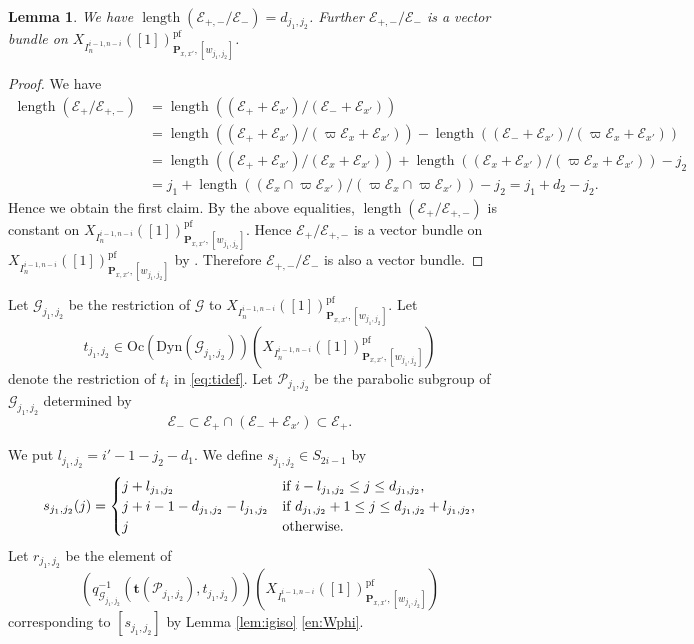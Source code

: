 \documentclass[12pt,a4paper]{article}
\newtheorem{lem}[thm]{Lemma}
\DeclareMathOperator{\length}{length}
\newcommand{\bfP}{\mathbf{P}}
\newcommand{\bft}{\mathbf{t}}
\newcommand{\cE}{\mathcal{E}}
\newcommand{\sG}{\mathscr{G}}
\newcommand{\sP}{\mathscr{P}}
\newcommand{\pf}{\mathrm{pf}}
\begin{document}
\begin{lem}\label{lem:lengE+-}
We have 
$\length (\cE_{+,-}/\cE_-)=d_{j_1,j_2}$. 
Further $\cE_{+,-}/\cE_-$ is a vector bundle on 
$X_{I_{n}^{i-1,n-i}}([1])_{\bfP_{x,x'},[w_{j_1,j_2}]}^{\pf}$. 
\end{lem}
\begin{proof}
We have 
\begin{align*}
 \length (\cE_+/\cE_{+,-})&= \length ((\cE_+ +\cE_{x'})/(\cE_- +\cE_{x'})) \\ 
 &=\length ((\cE_+ +\cE_{x'})/(\varpi \cE_x + \cE_{x'} )) - \length ((\cE_- +\cE_{x'})/(\varpi \cE_x + \cE_{x'} )) \\ 
  &=\length ((\cE_+ +\cE_{x'})/( \cE_x + \cE_{x'} )) + 
  \length ((\cE_x + \cE_{x'})/(\varpi \cE_x + \cE_{x'} )) 
  - j_2 \\ 
  &=j_1 + 
  \length (( \cE_x \cap \varpi \cE_{x'} )/(\varpi \cE_x \cap \varpi\cE_{x'})) 
  - j_2 =j_1+d_2 -j_2. 
\end{align*}
Hence we obtain the first claim. 
By the above equalities, 
$\length (\cE_+/\cE_{+,-})$ is constant on 
$X_{I_{n}^{i-1,n-i}}([1])_{\bfP_{x,x'},[w_{j_1,j_2}]}^{\pf}$. Hence $\cE_+/\cE_{+,-}$ is a vector bundle on 
$X_{I_{n}^{i-1,n-i}}([1])_{\bfP_{x,x'},[w_{j_1,j_2}]}^{\pf}$ 
by \cite[Lemma 7.3]{BhScProWG}. 
Therefore $\cE_{+,-}/\cE_-$ is also a vector bundle. 
\end{proof}

Let $\sG_{j_1,j_2}$ be the restriction of $\sG$ to 
$X_{I_{n}^{i-1,n-i}}([1])_{\bfP_{x,x'},[w_{j_1,j_2}]}^{\pf}$. 
Let
\[
 t_{j_1,j_2} \in \mathrm{Oc}(\mathrm{Dyn}(\sG_{j_1,j_2}))(X_{I_{n}^{i-1,n-i}}([1])_{\bfP_{x,x'},[w_{j_1,j_2}]}^{\pf})  
\] 
denote the restriction of $t_i$ in \eqref{eq:tidef}. 
Let $\sP_{j_1,j_2}$ be the parabolic subgroup of $\sG_{j_1,j_2}$ 
determined by 
\[
 \cE_- \subset \cE_+ \cap (\cE_- +\cE_{x'}) \subset \cE_+. 
\]

We put $l_{j_1,j_2}=i'-1-j_2 -d_1$. 
We define $s_{j_1,j_2} \in S_{2i-1}$ by 
\[
 s_{j_1,j_2}(j)=  
 \begin{cases}
 j+l_{j_1,j_2} 
 & \textrm{if $
 i -l_{j_1,j_2} 
 \leq j \leq d_{j_1,j_2}$,} \\ 
 j +i-1 -d_{j_1,j_2} -l_{j_1,j_2}
 & \textrm{if $d_{j_1,j_2} +1 \leq j \leq 
 d_{j_1,j_2}+l_{j_1,j_2} 
 $,} \\ 
 j & \textrm{otherwise.} 
 \end{cases}
\]
Let $r_{j_1,j_2}$ be the element of 
\[
 (q_{\sG_{j_1,j_2}}^{-1}(\bft (\sP_{j_1,j_2}),t_{j_1,j_2}))(X_{I_{n}^{i-1,n-i}}([1])_{\bfP_{x,x'},[w_{j_1,j_2}]}^{\pf})
\]
corresponding to $[s_{j_1,j_2}]$ by 
Lemma \ref{lem:igiso} \ref{en:Wphi}. 
\end{document}
